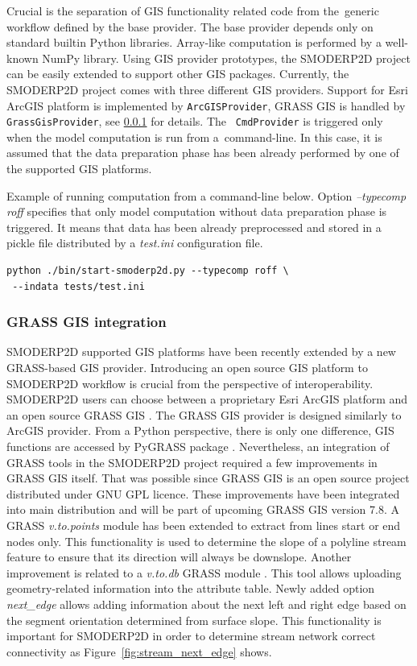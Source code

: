 Crucial is the separation of GIS functionality related code from
the~generic workflow defined by the base provider. The base provider
depends only on standard builtin Python libraries. Array-like
computation is performed by a well-known NumPy library. Using GIS
provider prototypes, the SMODERP2D project can be easily extended to
support other GIS packages. Currently, the SMODERP2D project comes
with three different GIS providers. Support for Esri ArcGIS platform
is implemented by {\tt ArcGISProvider}, GRASS GIS is handled by {\tt
  GrassGisProvider}, see \ref{sec:grass_provider} for details. The {\tt
  CmdProvider} is triggered only when the model computation is run
from a~command-line. In this case, it is assumed that the data
preparation phase has been already performed by one of the supported GIS
platforms.

Example of running computation from a command-line below. Option {\it
  --typecomp roff} specifies that only model computation without data
preparation phase is triggered. It means that data has been already
preprocessed and stored in a pickle file distributed by a {\it test.ini}
configuration file.

\begin{verbatim}
python ./bin/start-smoderp2d.py --typecomp roff \
 --indata tests/test.ini
\end{verbatim}

\subsubsection{GRASS GIS integration}\label{sec:grass_provider}
SMODERP2D supported GIS platforms have been recently extended by a
new GRASS-based GIS provider. Introducing an open source GIS platform
to SMODERP2D workflow is crucial from the perspective of
interoperability. SMODERP2D users can choose between a proprietary
Esri ArcGIS platform and an open source GRASS GIS
\cite{neteler2012grass}. The GRASS GIS provider is designed similarly
to ArcGIS provider. From a Python perspective, there is only one
difference, GIS functions are accessed by PyGRASS package
\cite{ijgi2010201}. Nevertheless, an integration of GRASS tools in the
SMODERP2D project required a few improvements in GRASS GIS
itself. That was possible since GRASS GIS is an open source project
distributed under GNU GPL licence. These improvements have been
integrated into main distribution and will be part of upcoming GRASS
GIS version 7.8. A GRASS {\em v.to.points} module
\cite{v-to-points-2019} has been extended to extract from lines start
or end nodes only. This functionality is used to determine the slope
of a polyline stream feature to ensure that its direction will always
be downslope. Another
improvement is related to a {\em v.to.db} GRASS module
\cite{v-to-db-2019}. This tool allows uploading geometry-related
information into the attribute table. 
Newly added option {\it
next\_edge} allows adding information about the next left and right
edge based on the segment orientation determined from surface slope. 
This functionality is important for SMODERP2D in order to
determine stream network correct connectivity as
Figure~\ref{fig:stream_next_edge} shows.

